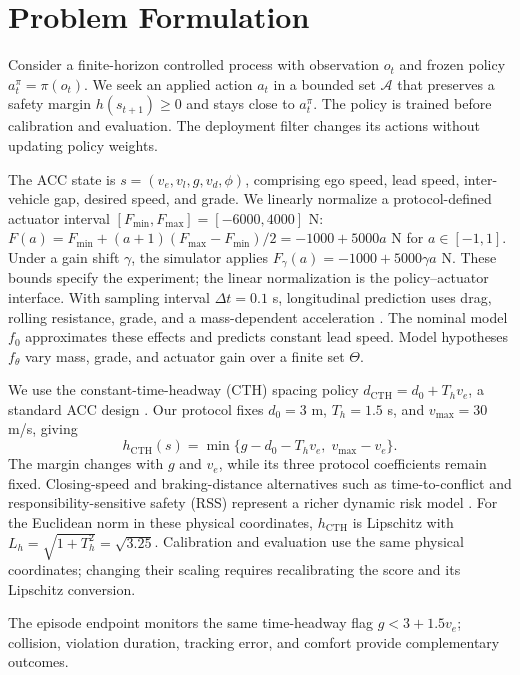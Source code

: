 \section{Problem Formulation}
Consider a finite-horizon controlled process with observation $o_t$ and
frozen policy $a_t^\pi=\pi(o_t)$. We seek an applied action $a_t$ in a bounded set
$\mathcal A$ that preserves a safety margin $h(s_{t+1})\geq0$ and stays
close to $a_t^\pi$. The policy is trained before calibration and evaluation.
The deployment filter changes its actions without updating policy weights.

The ACC state is $s=(v_e,v_l,g,v_d,\phi)$, comprising ego speed, lead
speed, inter-vehicle gap, desired speed, and grade. We linearly normalize a
protocol-defined actuator interval $[F_{\min},F_{\max}]=[-6000,4000]$ N:
$F(a)=F_{\min}+(a+1)(F_{\max}-F_{\min})/2=-1000+5000a$ N for
$a\in[-1,1]$. Under a gain shift $\gamma$, the simulator applies
$F_\gamma(a)=-1000+5000\gamma a$ N. These bounds specify the experiment;
the linear normalization is the policy--actuator interface. With sampling interval
$\Delta t=0.1$ s, longitudinal prediction uses drag, rolling resistance,
grade, and a mass-dependent acceleration \cite{rajamani2012vehicle}.
The nominal model $f_0$ approximates these effects and predicts constant lead
speed. Model hypotheses $f_\theta$ vary mass, grade, and actuator gain over
a finite set $\Theta$.

We use the constant-time-headway (CTH) spacing policy
$d_{\mathrm{CTH}}=d_0+T_hv_e$, a standard ACC design
\cite{wu2020spacing,molnar2023cruise}. Our protocol fixes
$d_0=3$ m, $T_h=1.5$ s, and $v_{\max}=30$ m/s, giving
\begin{equation}
 h_{\mathrm{CTH}}(s)=\min\{g-d_0-T_hv_e,\;v_{\max}-v_e\}.
 \label{eq:margin}
\end{equation}
The margin changes with $g$ and $v_e$, while its three protocol coefficients
remain fixed. Closing-speed and braking-distance alternatives such as
time-to-conflict and responsibility-sensitive safety (RSS) represent a richer
dynamic risk model \cite{molnar2023cruise,shalevshwartz2017rss}.
For the Euclidean norm in these physical coordinates,
$h_{\mathrm{CTH}}$ is Lipschitz with
$L_h=\sqrt{1+T_h^2}=\sqrt{3.25}$.
Calibration and evaluation use the same physical coordinates; changing their
scaling requires recalibrating the score and its Lipschitz conversion.

The episode endpoint monitors the same time-headway flag $g<3+1.5v_e$;
collision, violation duration, tracking error, and comfort provide
complementary outcomes.
